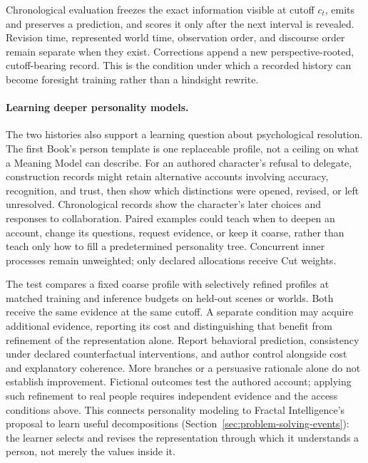\documentclass[10pt]{article}
\begin{document}
Chronological evaluation freezes the exact information visible at cutoff
$c_t$, emits and preserves a prediction, and scores it only after the next
interval is revealed. Revision time, represented world time, observation order,
and discourse order remain separate when they exist. Corrections append a new
perspective-rooted, cutoff-bearing record. This is the condition under which a recorded
history can become foresight training rather than a hindsight rewrite.

\paragraph{Learning deeper personality models.}
The two histories also support a learning question about psychological
resolution. The first Book's person template is one replaceable profile, not a
ceiling on what a Meaning Model can describe. For an authored character's
refusal to delegate, construction records might retain alternative accounts
involving accuracy, recognition, and trust, then show which distinctions were
opened, revised, or left unresolved. Chronological records show the character's
later choices and responses to collaboration. Paired examples could teach when
to deepen an account, change its questions, request evidence, or keep it coarse,
rather than teach only how to fill a predetermined personality tree. Concurrent
inner processes remain unweighted; only declared allocations receive Cut
weights.

The test compares a fixed coarse profile with selectively refined profiles at
matched training and inference budgets on held-out scenes or worlds. Both
receive the same evidence at the same cutoff. A separate condition may acquire
additional evidence, reporting its cost and distinguishing that benefit from
refinement of the representation alone. Report
behavioral prediction, consistency under declared counterfactual interventions,
and author control alongside cost and explanatory coherence. More branches or
a persuasive rationale alone do not establish improvement. Fictional outcomes
test the authored account; applying such refinement to real people requires
independent evidence and the access conditions above. This connects personality
modeling to Fractal Intelligence's proposal to learn useful decompositions
(Section~\ref{sec:problem-solving-events}): the learner selects and revises the
representation through which it understands a person, not merely the values
inside it.
\end{document}
